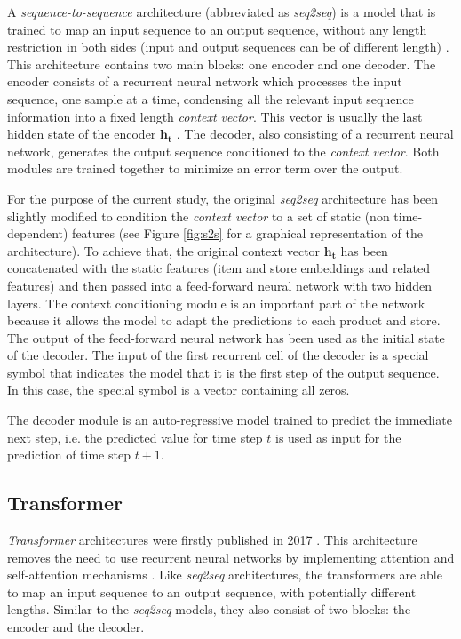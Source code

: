 A \textit{sequence-to-sequence} architecture (abbreviated as \textit{seq2seq}) is a model that is trained to map an input sequence to an output sequence, without any length restriction in both sides (input and output sequences can be of different length) \autocite{sutskever2014}. This architecture contains two main blocks: one encoder and one decoder. The encoder consists of a recurrent neural network which processes the input sequence, one sample at a time, condensing all the relevant input sequence information into a fixed length \textit{context vector}. This vector is usually the last hidden state of the encoder $\mathbf{h_t}$ \autocite{uday2019}. The decoder, also consisting of a recurrent neural network, generates the output sequence conditioned to the \textit{context vector}. Both modules are trained together to minimize an error term over the output.



For the purpose of the current study, the original \textit{seq2seq} architecture has been slightly modified to condition the \textit{context vector} to a set of static (non time-dependent) features (see Figure \ref{fig:s2s} for a graphical representation of the architecture). To achieve that, the original context vector $\mathbf{h_t}$ has been concatenated with the static features (item and store embeddings and related features) and then passed into a feed-forward neural network with two hidden layers. The context conditioning module is an important part of the network because it allows the model to adapt the predictions to each product and store. The output of the feed-forward neural network has been used as the initial state of the decoder. The input of the first recurrent cell of the decoder is a special symbol that indicates the model that it is the first step of the output sequence. In this case, the special symbol is a vector containing all zeros.

The decoder module is an auto-regressive model trained to predict the immediate next step, i.e. the predicted value for time step $t$ is used as input for the prediction of time step $t+1$.



\subsection{Transformer}
\textit{Transformer} architectures were firstly published  in 2017 \autocite{vaswani2017}. This architecture removes the need to use recurrent neural networks by implementing attention and self-attention mechanisms \autocite{bahdanau2015}.  Like \textit{seq2seq} architectures, the transformers are able to map an input sequence to an output sequence, with potentially different lengths. Similar to the \textit{seq2seq} models, they also consist of two blocks: the encoder and the decoder.

